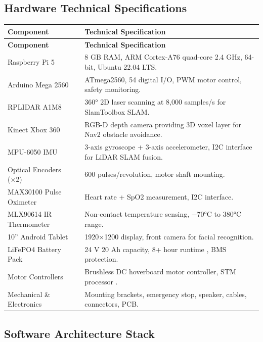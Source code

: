 \documentclass[12pt,a4paper]{report}
\renewcommand{\arraystretch}{1.45}
\renewcommand{\arraystretch}{1.3}
\begin{document}
\subsection{Hardware Technical Specifications}
\begin{center}
\label{tab:hw_specs}
{\renewcommand{\arraystretch}{1.7}
\begin{longtable}{@{}p{3.5cm}p{\dimexpr\textwidth-3.5cm-2\tabcolsep}@{}}
\toprule
\textbf{Component} & \textbf{Technical Specification} \\
\midrule
\endfirsthead
\toprule
\textbf{Component} & \textbf{Technical Specification} \\
\midrule
\endhead
\bottomrule
\endfoot
Raspberry Pi 5       & 8 GB RAM, ARM Cortex-A76 quad-core 2.4 GHz, 64-bit, Ubuntu 22.04 LTS. \\
\midrule
Arduino Mega 2560    & ATmega2560, 54 digital I/O, PWM motor control, safety monitoring. \\
\midrule
RPLIDAR A1M8         & 360° 2D laser scanning at 8,000 samples/s for SlamToolbox SLAM. \\
\midrule
Kinect Xbox 360      & RGB-D depth camera providing 3D voxel layer for Nav2 obstacle avoidance. \\
\midrule
MPU-6050 IMU         & 3-axis gyroscope + 3-axis accelerometer, I2C interface for LiDAR SLAM fusion. \\
\midrule
Optical Encoders (×2) & 600 pulses/revolution, motor shaft mounting. \\
\midrule
MAX30100 Pulse Oximeter & Heart rate + SpO2 measurement, I2C interface. \\
\midrule
MLX90614 IR Thermometer & Non-contact temperature sensing, $-$70°C to 380°C range. \\
\midrule
10'' Android Tablet  & 1920×1200 display, front camera for facial recognition. \\
\midrule
LiFePO4 Battery Pack & 24 V 20 Ah capacity, 8+ hour runtime \cite{iso7176_4}, BMS protection. \\
\midrule
Motor Controllers    & Brushless DC hoverboard motor controller, STM processor \cite{bldc_foc}. \\
\midrule
Mechanical \& Electronics & Mounting brackets, emergency stop, speaker, cables, connectors, PCB. \\
\end{longtable}}
\end{center}
\subsection{Software Architecture Stack}
\end{document}

